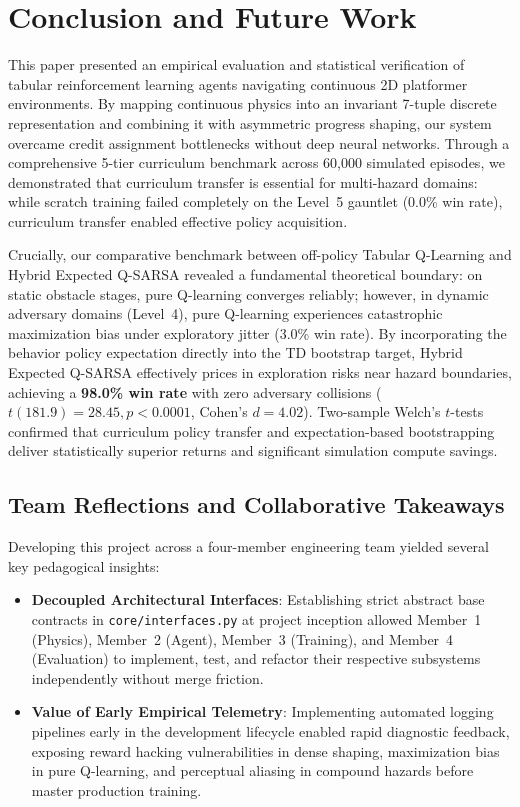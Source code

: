 \section{Conclusion and Future Work}
\label{sec:conclusion}

This paper presented an empirical evaluation and statistical verification of tabular reinforcement learning agents navigating continuous 2D platformer environments. By mapping continuous physics into an invariant 7-tuple discrete representation and combining it with asymmetric progress shaping, our system overcame credit assignment bottlenecks without deep neural networks. Through a comprehensive 5-tier curriculum benchmark across 60,000 simulated episodes, we demonstrated that curriculum transfer is essential for multi-hazard domains: while scratch training failed completely on the Level~5 gauntlet (0.0\% win rate), curriculum transfer enabled effective policy acquisition.

Crucially, our comparative benchmark between off-policy Tabular Q-Learning and Hybrid Expected Q-SARSA revealed a fundamental theoretical boundary: on static obstacle stages, pure Q-learning converges reliably; however, in dynamic adversary domains (Level~4), pure Q-learning experiences catastrophic maximization bias under exploratory jitter (3.0\% win rate). By incorporating the behavior policy expectation directly into the TD bootstrap target, Hybrid Expected Q-SARSA effectively prices in exploration risks near hazard boundaries, achieving a \textbf{98.0\% win rate} with zero adversary collisions ($t(181.9) = 28.45, p < 0.0001$, Cohen's $d = 4.02$). Two-sample Welch's $t$-tests confirmed that curriculum policy transfer and expectation-based bootstrapping deliver statistically superior returns and significant simulation compute savings.

\subsection{Team Reflections and Collaborative Takeaways}
Developing this project across a four-member engineering team yielded several key pedagogical insights:
\begin{itemize}
    \item \textbf{Decoupled Architectural Interfaces}: Establishing strict abstract base contracts in \texttt{core/interfaces.py} at project inception allowed Member~1 (Physics), Member~2 (Agent), Member~3 (Training), and Member~4 (Evaluation) to implement, test, and refactor their respective subsystems independently without merge friction.
    \item \textbf{Value of Early Empirical Telemetry}: Implementing automated logging pipelines early in the development lifecycle enabled rapid diagnostic feedback, exposing reward hacking vulnerabilities in dense shaping, maximization bias in pure Q-learning, and perceptual aliasing in compound hazards before master production training.
\end{itemize}

